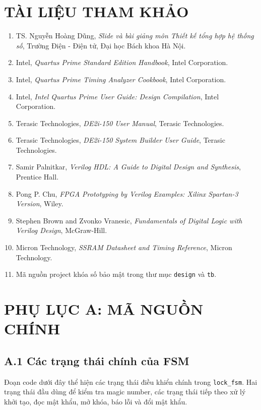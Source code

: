 \documentclass[13pt,a4paper]{article}
\begin{document}
\section*{TÀI LIỆU THAM KHẢO}
\begin{enumerate}
  \item TS. Nguyễn Hoàng Dũng, \textit{Slide và bài giảng môn Thiết kế tổng hợp hệ thống số}, Trường Điện - Điện tử, Đại học Bách khoa Hà Nội.
  \item Intel, \textit{Quartus Prime Standard Edition Handbook}, Intel Corporation.
  \item Intel, \textit{Quartus Prime Timing Analyzer Cookbook}, Intel Corporation.
  \item Intel, \textit{Intel Quartus Prime User Guide: Design Compilation}, Intel Corporation.
  \item Terasic Technologies, \textit{DE2i-150 User Manual}, Terasic Technologies.
  \item Terasic Technologies, \textit{DE2i-150 System Builder User Guide}, Terasic Technologies.
  \item Samir Palnitkar, \textit{Verilog HDL: A Guide to Digital Design and Synthesis}, Prentice Hall.
  \item Pong P. Chu, \textit{FPGA Prototyping by Verilog Examples: Xilinx Spartan-3 Version}, Wiley.
  \item Stephen Brown and Zvonko Vranesic, \textit{Fundamentals of Digital Logic with Verilog Design}, McGraw-Hill.
  \item Micron Technology, \textit{SSRAM Datasheet and Timing Reference}, Micron Technology.
  \item Mã nguồn project khóa số bảo mật trong thư mục \texttt{design} và \texttt{tb}.
\end{enumerate}

\newpage
\section*{PHỤ LỤC A: MÃ NGUỒN CHÍNH}
\subsection*{A.1 Các trạng thái chính của FSM}
Đoạn code dưới đây thể hiện các trạng thái điều khiển chính trong \texttt{lock\_fsm}. Hai trạng thái đầu dùng để kiểm tra magic number, các trạng thái tiếp theo xử lý khởi tạo, đọc mật khẩu, mở khóa, báo lỗi và đổi mật khẩu.
\end{document}
